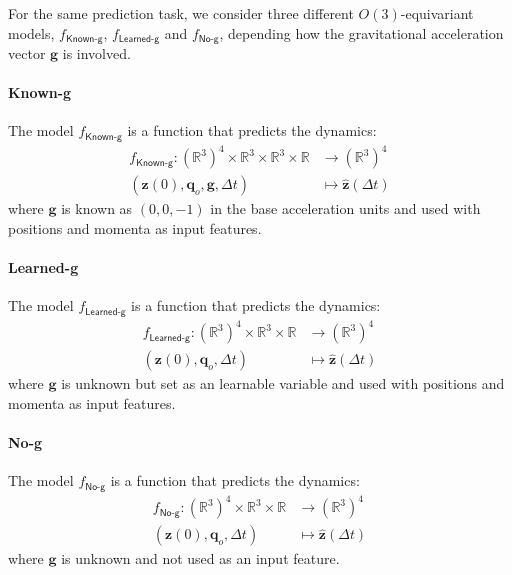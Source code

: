 \documentclass{article}
\theoremstyle{plain}
\theoremstyle{definition}
\theoremstyle{remark}
\begin{document}
For the same prediction task, we consider three different $O(3)$-equivariant models, $f_{\textsf{Known-g}}$, $f_{\textsf{Learned-g}}$ and $f_{\textsf{No-g}}$, depending how the gravitational acceleration vector $\mathbf{g}$ is involved. 
\paragraph{Known-g} The model $f_{\textsf{Known-g}}$ is a function that predicts the dynamics: 
\begin{equation}
\begin{aligned}
    f_{\textsf{Known-g}}: (\mathbb R^3)^4\times \mathbb{R}^3 \times \mathbb{R}^3 \times \mathbb R &\to (\mathbb R^{3})^4  \\
    (\mathbf{z}(0),\mathbf{q}_o,\mathbf{g},\Delta t) &\mapsto  \mathbf{\hat z}(\Delta t) 
\end{aligned}\label{eq:goal_F_know-g}
\end{equation}
where $\mathbf{g}$ is known as $(0,0,-1)$ in the base acceleration units and used with positions and momenta as input features.  

\paragraph{Learned-g} The model $f_{\textsf{Learned-g}}$ is a function that predicts the dynamics: 
\begin{equation}
\begin{aligned}
    f_{\textsf{Learned-g}}: (\mathbb R^3)^4 \times \mathbb{R}^3 \times \mathbb R &\to (\mathbb R^{3})^4  \\
    (\mathbf{z}(0),\mathbf{q}_o, \Delta t) &\mapsto  \mathbf{\hat z}(\Delta t) 
\end{aligned}\label{eq:goal_F_learn-g}
\end{equation}
where $\mathbf{g}$ is unknown but set as an learnable variable and used with positions and momenta as input features.   

\paragraph{No-g} The model $f_{\textsf{No-g}}$ is a function that predicts the dynamics: 
\begin{equation}
\begin{aligned}
    f_{\textsf{No-g}}: (\mathbb R^3)^4 \times \mathbb{R}^3 \times \mathbb R &\to (\mathbb R^{3})^4  \\
    (\mathbf{z}(0),\mathbf{q}_o, \Delta t) &\mapsto  \mathbf{\hat z}(\Delta t)
\end{aligned}\label{eq:goal_F_no-g}
\end{equation}
where $\mathbf{g}$ is unknown and not used as an input feature.
\end{document}
